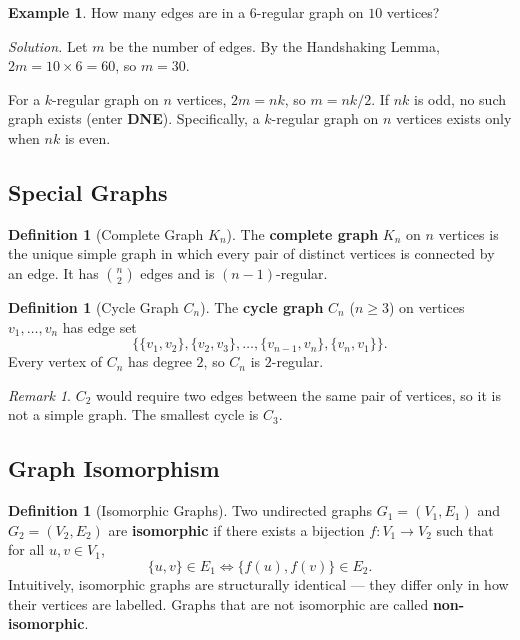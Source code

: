 \documentclass[11pt, a4paper, notitlepage]{report}
\theoremstyle{definition}
\newtheorem{definition}[theorem]{Definition}
\newtheorem{example}[theorem]{Example}
\theoremstyle{remark}
\newtheorem{remark}[theorem]{Remark}
\begin{document}
\begin{example}
How many edges are in a $6$-regular graph on $10$ vertices?

\textit{Solution.} Let $m$ be the number of edges. By the Handshaking Lemma,
$2m = 10 \times 6 = 60$, so $m = 30$.
\end{example}

\begin{examtip}[title={Exam Tip: Applying the Handshaking Lemma}]
  For a $k$-regular graph on $n$ vertices, $2m = nk$, so $m = nk/2$. If $nk$ is odd,
  no such graph exists (enter \textbf{DNE}). Specifically, a $k$-regular graph on $n$ vertices
  exists only when $nk$ is even.
\end{examtip}

\subsection{Special Graphs}
\label{subsec:special-graphs}

\begin{definition}[Complete Graph $K_n$]
\label{def:complete-graph}
The \textbf{complete graph} $K_n$ on $n$ vertices is the unique simple graph in which every
pair of distinct vertices is connected by an edge. It has $\binom{n}{2}$ edges and is
$(n-1)$-regular.
\end{definition}

\begin{definition}[Cycle Graph $C_n$]
\label{def:cycle}
The \textbf{cycle graph} $C_n$ ($n \ge 3$) on vertices $v_1, \ldots, v_n$ has edge set
\[
  \bigl\{\{v_1,v_2\},\{v_2,v_3\},\ldots,\{v_{n-1},v_n\},\{v_n,v_1\}\bigr\}.
\]
Every vertex of $C_n$ has degree $2$, so $C_n$ is $2$-regular.
\end{definition}

\begin{remark}
$C_2$ would require two edges between the same pair of vertices, so it is not a simple graph.
The smallest cycle is $C_3$.
\end{remark}

\subsection{Graph Isomorphism}
\label{subsec:isomorphism}

\begin{definition}[Isomorphic Graphs]
\label{def:isomorphism}
Two undirected graphs $G_1 = (V_1, E_1)$ and $G_2 = (V_2, E_2)$ are \textbf{isomorphic}
if there exists a bijection $f : V_1 \to V_2$ such that for all $u, v \in V_1$,
\[
  \{u,v\} \in E_1 \iff \{f(u), f(v)\} \in E_2.
\]
Intuitively, isomorphic graphs are structurally identical — they differ only in how their
vertices are labelled. Graphs that are not isomorphic are called \textbf{non-isomorphic}.
\end{definition}
\end{document}
